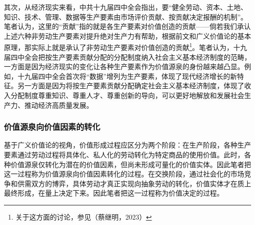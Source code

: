 其次，从经济现实来看，中共十九届四中全会指出，要“健全劳动、资本、土地、知识、技术、管理、数据等生产要素由市场评价贡献、按贡献决定报酬的机制”\cite[39]{ZhongGuoGongChanDangDiShiJiuJieZhongYangWeiYuanHuiDiSiCiQuanTiHuiYiWenJianHuiBian2019}。笔者认为，这里的“贡献”指的就是各生产要素对价值创造的贡献——倘若我们承认上述六种非劳动生产要素对提升绝对生产力有帮助，根据前文和广义价值论的基本原理，那实际上就是承认了非劳动生产要素对价值创造的贡献\footnote{关于这方面的讨论，参见（蔡继明，2023）\cite[26-56]{CaiJiMingCongGuDianZhengZhiJingJiXueDaoZhongGuoTeSeSheHuiZhuYiZhengZhiJingJiXueJiYuZhongGuoShiJiaoDeZhengZhiJingJiXueYanBianXiaCe2023}}。笔者认为，十九届四中全会把按生产要素贡献分配的分配制度纳入社会主义基本经济制度的范畴\cite[5]{XieFuZhanWanShanJiBenJingJiZhiDuTuiJinGuoJiaZhiLiTiXiXianDaiHuaXueXiGuanCheZhongGongShiJiuJieSiZhongQuanHuiJingShenBiTan2020}，一方面是因为经济现实的变化让各种生产要素作为价值源泉的身份越来越凸显。例如，十九届四中全会首次将“数据”增列为生产要素，体现了现代经济增长的新特征\cite[6]{CaiJiMingLunShuJuYaoSuAnGongXianCanYuFenPeiDeJieZhiJiChuJiYuGuangYiJieZhiLunDeShiJiao2023}\cite[5]{XieFuZhanWanShanJiBenJingJiZhiDuTuiJinGuoJiaZhiLiTiXiXianDaiHuaXueXiGuanCheZhongGongShiJiuJieSiZhongQuanHuiJingShenBiTan2020}。另一方面是因为将按生产要素贡献分配确定社会主义基本经济制度，体现了收入分配制度尊重知识、尊重人才、尊重创新的导向，可以更好地解放和发展社会生产力、推动经济高质量发展\cite[4-5]{XieFuZhanWanShanJiBenJingJiZhiDuTuiJinGuoJiaZhiLiTiXiXianDaiHuaXueXiGuanCheZhongGongShiJiuJieSiZhongQuanHuiJingShenBiTan2020}。

\subsubsection{价值源泉向价值因素的转化}

基于广义价值论的视角，价值形成过程应区分为两个阶段：在生产阶段，各种生产要素通过劳动过程将具体化、私人化的劳动转化为特定商品的使用价值。此时，各种价值源泉仅转化为潜在的价值因素，但尚未形成可量化的价值实体。因此笔者把这一过程称为价值源泉向价值因素转化的过程。在交换阶段，通过社会化的市场竞争和供需双方的博弈，具体劳动才真正实现向抽象劳动的转化，价值实体才在质上最终形成，在量上决定下来。因此笔者把这一过程称为价值决定的过程。

